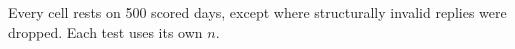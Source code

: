 Every cell rests on 500 scored days, except where structurally invalid replies were dropped. Each test uses its own $n$.
